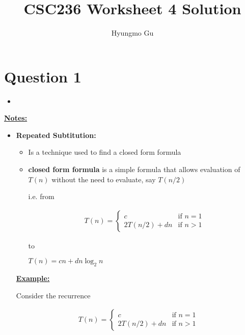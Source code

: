\documentclass[12pt]{article}
\begin{document}
\title{CSC236 Worksheet 4 Solution}
\author{Hyungmo Gu}
\maketitle

\section*{Question 1}
\begin{itemize}
    \item
\end{itemize}

\bigskip

\underline{\textbf{Notes:}}

\begin{itemize}
    \item \textbf{Repeated Subtitution:}

    \begin{itemize}
        \item Is a technique used to find a closed form formula
        \item \textbf{closed form formula} is a simple formula that allows evaluation
        of $T(n)$ without the need to evaluate, say $T(n/2)$

        \bigskip

        i.e. from

        \begin{align}
            T(n) =
            \begin{cases}
            c & \text{if $n = 1$}\\
            2T(n/2) + dn & \text{if $n > 1$}
            \end{cases}
        \end{align}

        to

        \bigskip

        $T(n) = cn + dn \log_2 n$
    \end{itemize}

    \bigskip

    \begin{mdframed}
        \underline{\textbf{Example:}}

        \bigskip

        Consider the recurrence

        \begin{align}
            T(n) =
            \begin{cases}
            c & \text{if $n = 1$}\\
            2T(n/2) + dn & \text{if $n > 1$}
            \end{cases}
        \end{align}


\end{mdframed}
\end{itemize}
\end{document}
